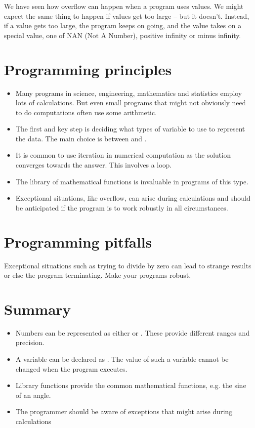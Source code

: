 		We have seen how overflow can happen when a program uses  values. We might expect the same thing to happen if  values get too large – but it doesn't. Instead, if a value gets too large, the program keeps on going, and the value takes on a special value, one of NAN (Not A Number), positive infinity or minus infinity.


	\section{Programming principles}
		\begin{itemize}
      \item Many programs in science, engineering, mathematics and statistics employ lots of calculations. But even small programs that might not obviously need to do computations often use some arithmetic.
      \item The first and key step is deciding what types of variable to use to represent the data. The main choice is between  and .
      \item It is common to use iteration in numerical computation as the solution converges towards the answer. This involves a loop.
      \item The library of mathematical functions is invaluable in programs of this type.
      \item Exceptional situations, like overflow, can arise during calculations and should be anticipated if the program is to work robustly in all circumstances.
		\end{itemize}

				
	\section{Programming pitfalls}
		Exceptional situations such as trying to divide by zero can lead to strange results or else the program terminating. Make your programs robust.

		
	\section{Summary}
		\begin{itemize}
      \item Numbers can be represented as either  or . These provide different ranges and precision.
			\item A variable can be declared as . The value of such a variable cannot be changed when the program executes.
      \item Library functions provide the common mathematical functions, e.g. the sine of an angle.
      \item The programmer should be aware of exceptions that might arise during calculations 
		\end{itemize}

